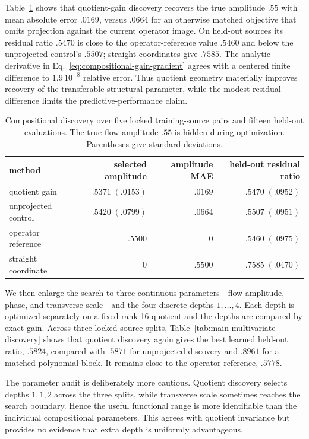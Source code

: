 \documentclass[11pt]{article}
\numberwithin{algorithm}{section}
\theoremstyle{definition}\newtheorem{definition}[theorem]{Definition}
\theoremstyle{remark}\newtheorem{remark}[theorem]{Remark}
\begin{document}
Table~\ref{tab:main-composition-discovery} shows that quotient-gain discovery
recovers the true amplitude $.55$ with mean absolute error $.0169$, versus
$.0664$ for an otherwise matched objective that omits projection against the
current operator image.  On held-out sources its residual ratio $.5470$ is
close to the operator-reference value $.5460$ and below the unprojected
control's $.5507$; straight coordinates give $.7585$.  The analytic derivative
in Eq.~\eqref{eq:compositional-gain-gradient} agrees with a centered finite
difference to $1.9\,10^{-8}$ relative error.  Thus quotient geometry
materially improves recovery of the transferable structural parameter, while
the modest residual difference limits the predictive-performance claim.

\begin{table}[H]
\centering
\caption{Compositional discovery over five locked training-source pairs and
fifteen held-out evaluations.  The true flow amplitude $.55$ is hidden during
optimization.  Parentheses give standard deviations.}
\label{tab:main-composition-discovery}
\begin{tabular}{lrrr}
\toprule
method & selected amplitude & amplitude MAE & held-out residual ratio\\
\midrule
quotient gain & $.5371\;(.0153)$ & $.0169$ & $.5470\;(.0952)$\\
unprojected control & $.5420\;(.0799)$ & $.0664$ & $.5507\;(.0951)$\\
operator reference & $.5500$ & $0$ & $.5460\;(.0975)$\\
straight coordinate & $0$ & $.5500$ & $.7585\;(.0470)$\\
\bottomrule
\end{tabular}
\end{table}

\secondarynumericsF
We then enlarge the search to three continuous parameters---flow amplitude,
phase, and transverse scale---and the four discrete depths $1,\ldots,4$.
Each depth is optimized separately on a fixed rank-16 quotient and the depths
are compared by exact gain.  Across three locked source splits,
Table~\ref{tab:main-multivariate-discovery} shows that quotient discovery
again gives the best learned held-out ratio, $.5824$, compared with $.5871$
for unprojected discovery and $.8961$ for a matched polynomial block.  It
remains close to the operator reference, $.5778$.

The parameter audit is deliberately more cautious.  Quotient discovery
selects depths $1,1,2$ across the three splits, while transverse scale
sometimes reaches the search boundary.  Hence the useful functional range is
more identifiable than the individual compositional parameters.  This agrees
with quotient invariance but provides no evidence that extra depth is
uniformly advantageous.
\end{document}
